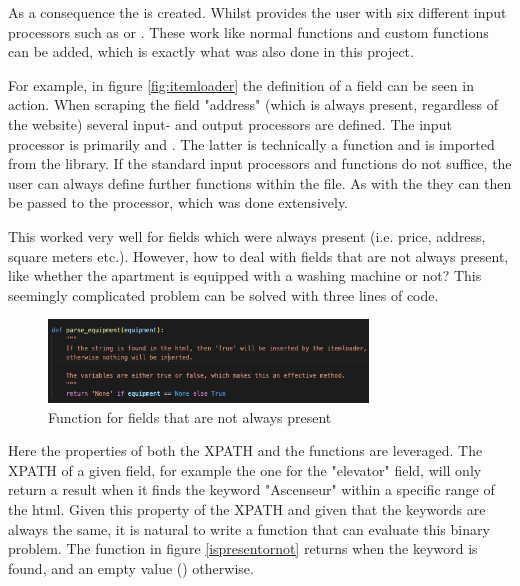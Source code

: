 \documentclass[main]{subfiles}
\begin{document}

As a consequence the \pkg[ItemLoader] is created.
Whilst \pkg[Scrapy] provides the user with six different input processors such as \pkg[TakeFirst()] or \pkg[MapCompose()].
These work like normal functions \cite{sDemystifyingScrapyItem2020} and custom functions can be added, 
which is exactly what was also done in this project.

For example, in figure \ref{fig:itemloader} the definition of a field can be seen in action.
When scraping the field "address" (which is always present, regardless of the website)
several input- and output processors are defined.
The input processor is primarily \pkg[MapCompose()] and .
The latter is technically a function and is imported from the  library.
If the standard input processors and functions do not suffice,
the user can always define further functions within the \pkg[items.py] file.
As with the  they can then be passed to the \pkg[MapCompose()] processor, 
which was done extensively.

This worked very well for fields which were always present (i.e. price, address, square meters etc.).
However, how to deal with fields that are not always present, 
like whether the apartment is equipped with a washing machine or not?
This seemingly complicated problem can be solved with three lines of code.

\begin{figure}[htbp]
    \centerline{
        \includegraphics[width = 85mm]{prog_6.png}}
    \caption{Function for fields that are not always present}
    \label{fig:ispresentornot}
\end{figure}

Here the properties of both the XPATH and the functions are leveraged.
The XPATH of a given field, for example the one for the "elevator" field, 
will only return a result when it finds the keyword "Ascenseur" within a specific range of the \acs*{html}.
Given this property of the XPATH and given that the keywords are always the same, 
it is natural to write a function that can evaluate this binary problem.
The function in figure \ref{ispresentornot} returns \pkg[True] when the keyword is found,
and an empty value (\pkg[N/A]) otherwise.
\end{document}
